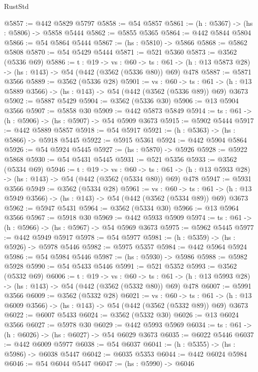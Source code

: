 \begin{lexlean}{RustStd}
\begin{coremodule}
@5857 := @442 @5829 @5797
@5858 := @54 @5857
@5861 := (h : @5367) -> (hs : @5806) -> @5858 @5444
@5862 := @5855 @5365
@5864 := @442 @5844 @5804
@5866 := @54 @5864 @5444
@5867 := (hs : @5810) -> @5866
@5868 := @5862 @5808
@5870 := @54 @5429 @5444
@5871 := @521 @5360
@5873 := @3562 (@5336 @69)
@5886 := {t : @19} ->
  {vs : @60} ->
  {ts : @61} -> (h : @13 @5873 @28) -> (hs : @143) -> @54 (@442 (@3562 (@5336 @80)) @69) @478
@5887 := @5871 @3566
@5889 := @3562 (@5336 @28)
@5901 := {vs : @60} ->
  {ts : @61} -> (h : @13 @5889 @3566) -> (hs : @143) -> @54 (@442 (@3562 (@5336 @89)) @69) @3673
@5902 := @5887 @5429
@5904 := @3562 (@5336 @30)
@5906 := @13 @5904 @3566
@5907 := @5858 @30
@5909 := @442 @5873 @5849
@5914 := {ts : @61} -> (h : @5906) -> (hs : @5907) -> @54 @5909 @3673
@5915 := @5902 @5444
@5917 := @442 @5889 @5857
@5918 := @54 @5917
@5921 := (h : @5363) -> (hs : @5866) -> @5918 @5445
@5922 := @5915 @5361
@5924 := @442 @5904 @5864
@5926 := @54 @5924 @5445
@5927 := (hs : @5870) -> @5926
@5928 := @5922 @5868
@5930 := @54 @5431 @5445
@5931 := @521 @5356
@5933 := @3562 (@5334 @69)
@5946 := {t : @19} ->
  {vs : @60} ->
  {ts : @61} -> (h : @13 @5933 @28) -> (hs : @143) -> @54 (@442 (@3562 (@5334 @80)) @69) @478
@5947 := @5931 @3566
@5949 := @3562 (@5334 @28)
@5961 := {vs : @60} ->
  {ts : @61} -> (h : @13 @5949 @3566) -> (hs : @143) -> @54 (@442 (@3562 (@5334 @89)) @69) @3673
@5962 := @5947 @5431
@5964 := @3562 (@5334 @30)
@5966 := @13 @5964 @3566
@5967 := @5918 @30
@5969 := @442 @5933 @5909
@5974 := {ts : @61} -> (h : @5966) -> (hs : @5967) -> @54 @5969 @3673
@5975 := @5962 @5445
@5977 := @442 @5949 @5917
@5978 := @54 @5977
@5981 := (h : @5359) -> (hs : @5926) -> @5978 @5446
@5982 := @5975 @5357
@5984 := @442 @5964 @5924
@5986 := @54 @5984 @5446
@5987 := (hs : @5930) -> @5986
@5988 := @5982 @5928
@5990 := @54 @5433 @5446
@5991 := @521 @5352
@5993 := @3562 (@5332 @69)
@6006 := {t : @19} ->
  {vs : @60} ->
  {ts : @61} -> (h : @13 @5993 @28) -> (hs : @143) -> @54 (@442 (@3562 (@5332 @80)) @69) @478
@6007 := @5991 @3566
@6009 := @3562 (@5332 @28)
@6021 := {vs : @60} ->
  {ts : @61} -> (h : @13 @6009 @3566) -> (hs : @143) -> @54 (@442 (@3562 (@5332 @89)) @69) @3673
@6022 := @6007 @5433
@6024 := @3562 (@5332 @30)
@6026 := @13 @6024 @3566
@6027 := @5978 @30
@6029 := @442 @5993 @5969
@6034 := {ts : @61} -> (h : @6026) -> (hs : @6027) -> @54 @6029 @3673
@6035 := @6022 @5446
@6037 := @442 @6009 @5977
@6038 := @54 @6037
@6041 := (h : @5355) -> (hs : @5986) -> @6038 @5447
@6042 := @6035 @5353
@6044 := @442 @6024 @5984
@6046 := @54 @6044 @5447
@6047 := (hs : @5990) -> @6046

\end{coremodule}
\end{lexlean}
